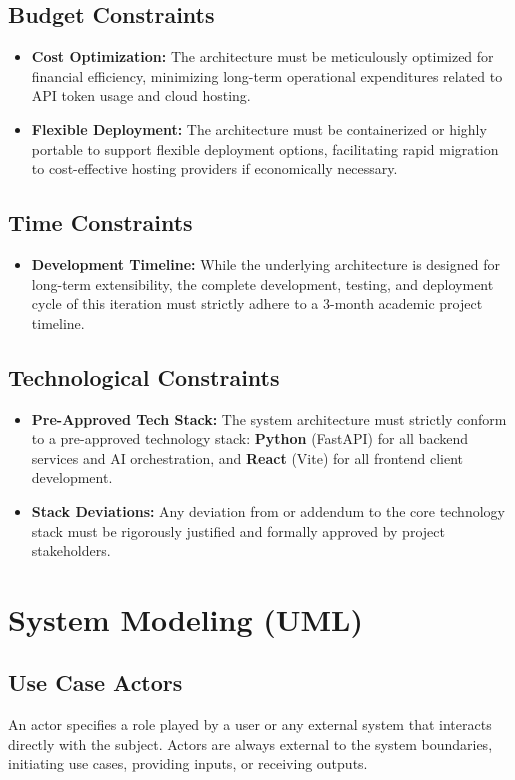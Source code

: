 \subsection{Budget Constraints}
\begin{itemize}
    \item \textbf{Cost Optimization:} The architecture must be meticulously optimized for financial efficiency, minimizing long-term operational expenditures related to API token usage and cloud hosting.
    \item \textbf{Flexible Deployment:} The architecture must be containerized or highly portable to support flexible deployment options, facilitating rapid migration to cost-effective hosting providers if economically necessary.
\end{itemize}

\subsection{Time Constraints}
\begin{itemize}
    \item \textbf{Development Timeline:} While the underlying architecture is designed for long-term extensibility, the complete development, testing, and deployment cycle of this iteration must strictly adhere to a 3-month academic project timeline.
\end{itemize}

\subsection{Technological Constraints}
\begin{itemize}
    \item \textbf{Pre-Approved Tech Stack:} The system architecture must strictly conform to a pre-approved technology stack: \textbf{Python} (FastAPI) for all backend services and AI orchestration, and \textbf{React} (Vite) for all frontend client development.
    \item \textbf{Stack Deviations:} Any deviation from or addendum to the core technology stack must be rigorously justified and formally approved by project stakeholders.
\end{itemize}

\section{System Modeling (UML)}
\subsection{Use Case Actors}
An actor specifies a role played by a user or any external system that interacts directly with the subject. Actors are always external to the system boundaries, initiating use cases, providing inputs, or receiving outputs.

